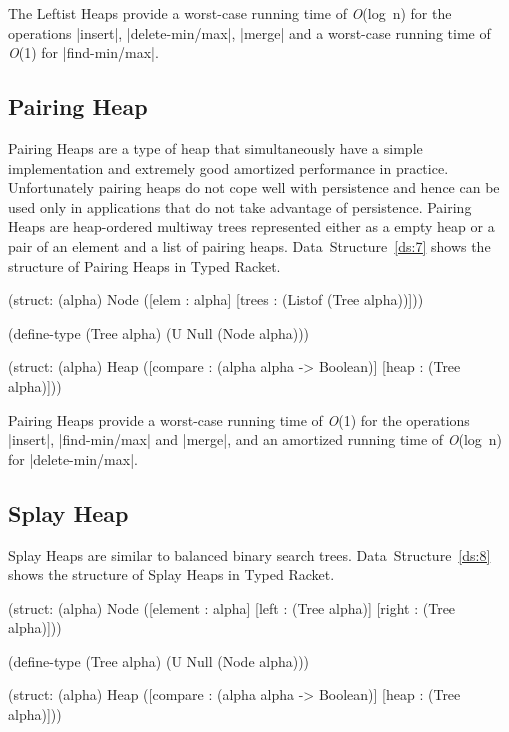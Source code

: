 \noindent
The Leftist Heaps provide a worst-case running time of \emph{O}(log~n)
for the operations \scheme|insert|, \scheme|delete-min/max|,
\scheme|merge| and a worst-case running time of \emph{O}(1) for
\scheme|find-min/max|.

\subsection*{Pairing Heap}
Pairing Heaps \citep{pairing} are a type of heap that simultaneously
have a simple implementation and extremely good amortized performance in
practice. Unfortunately pairing heaps do not cope well with persistence
and hence can be used only in applications that do not take advantage
of persistence.
Pairing Heaps are heap-ordered multiway trees represented either as a
empty heap or a pair of an element and a list of pairing
heaps. Data~Structure~\ref{ds:7} shows the structure of Pairing Heaps
in Typed Racket.%

\begin{datastructure}
  \begin{schemedisplay}

    (struct: (alpha) Node
      ([elem : alpha]
       [trees : (Listof (Tree alpha))]))

    (define-type (Tree alpha) (U Null (Node alpha)))

    (struct: (alpha) Heap
      ([compare : (alpha alpha -> Boolean)]
       [heap       : (Tree alpha)]))

  \end{schemedisplay}
  \label{ds:7}
\end{datastructure}

\noindent
Pairing Heaps provide a worst-case running time of \emph{O}(1) for the
operations \scheme|insert|, \scheme|find-min/max| and \scheme|merge|,
and an amortized running time of \emph{O}(log~n) for
\scheme|delete-min/max|.

\subsection*{Splay Heap}
Splay Heaps \citep{sla} are similar to balanced binary search trees.
Data~Structure~\ref{ds:8} shows the structure of Splay Heaps in Typed
Racket.

\begin{datastructure}
  \begin{schemedisplay}

    (struct: (alpha) Node
      ([element : alpha]
       [left        : (Tree alpha)]
       [right      : (Tree alpha)]))

    (define-type (Tree alpha) (U Null (Node alpha)))

    (struct: (alpha) Heap 
      ([compare : (alpha alpha -> Boolean)]
       [heap       : (Tree alpha)]))

  \end{schemedisplay}
  \label{ds:8}
\end{datastructure}

